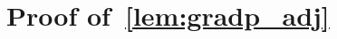 \documentclass[onefignum,onetabnum]{siamart251216} %
\renewcommand{\d}{\mathrm{d}}
\newcommand{\torus}{\mathbb T}
\newcommand{\real}{\mathbb R}
\newcommand{\mc}[1]{\mathcal{#1}}
\newcommand{\mesvit}{\kappa}
\newcommand{\projp}{\Pi}
\theoremstyle{plain}
\numberwithin{equation}{section}
\numberwithin{theorem}{section}
\begin{document}
\section{Proof of~\texorpdfstring{\cref{lem:gradp_adj}}{Lemma~\ref{lem:gradp_adj}}}
\end{document}
